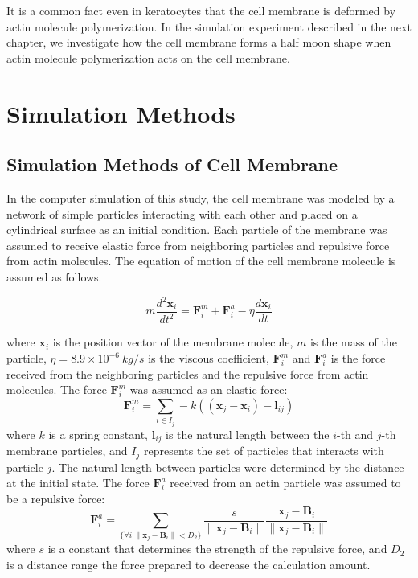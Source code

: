 \documentclass[a4paper,12pt, oneside]{book}
\begin{document}
It is a common fact even in keratocytes that the cell membrane is deformed by actin molecule polymerization. In the simulation experiment described in the next chapter, we investigate how the cell membrane forms a half moon shape when actin molecule polymerization acts on the cell membrane.


\chapter{Simulation Methods}
\section{Simulation Methods of Cell Membrane}
In the computer simulation of this study, the cell membrane was modeled by a network of simple particles interacting with each other and placed on a cylindrical surface as an initial condition.
Each particle of the membrane was assumed to receive elastic force from neighboring particles and repulsive force from actin molecules.
The equation of motion of the cell membrane molecule is assumed as follows.

\begin{equation}
m\frac{d^2\bm{x}_i}{dt^2} = \bm{F}^m_i +  \bm{F}^a_i - \eta \frac{d\bm{x}_i}{dt}
\end{equation}

where  $\bm{x}_i$ is the position vector of the membrane molecule, $m$ is the mass of the particle, $\eta=8.9\times10^{-6}\si{~kg/s}$ is the viscous coefficient, $\bm{F}^m_i$ and $\bm{F}^a_i$ is the force received from the neighboring particles and  the repulsive force from actin molecules.
The force  $\bm{F}^m_i$ was assumed as an elastic force:
\begin{equation}
\bm{F}^m_i = \sum_{i \in I_j}  -k((\bm{x}_j -\bm{x}_i )-\bm{l}_{ij} )
\end{equation}
where $k$ is a spring constant, $\bm{l}_{ij}$ is the natural length between the $i$-th and $j$-th membrane particles, and $I_j$ represents the set of particles that interacts with particle $j$.
The natural length between particles were determined by the distance  at the initial state.
The force $\bm{F}^a_i$ received from an actin particle was assumed to be a  repulsive force:
\begin{equation}
\bm{F}^a_i = \sum_{\{ \forall i | \| \bm{x}_j - \bm{B}_i \|<D_2\}} \frac{s}{\|\bm{x}_j -\bm{B}_i \|} \frac{\bm{x}_j -\bm{B}_i }{\|\bm{x}_j -\bm{B}_i \|}
\end{equation}
where $s$ is a constant that determines the strength of the repulsive force, and $D_2$ is a distance range  the  force prepared to decrease the calculation amount.
\end{document}
